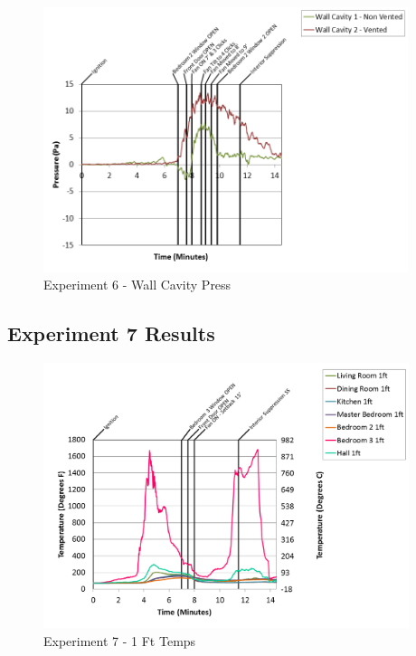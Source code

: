 \documentclass{article}
\begin{document}
\begin{appendices}
\begin{figure}[h!]
	\centering
	\includegraphics[height=3.05in]{0_Images/Results_Charts/Exp_6_Charts/WallCavityPress.png}
	\caption{Experiment 6 - Wall Cavity Press}
\end{figure}

\clearpage

\clearpage
\clearpage		\large
\subsection{Experiment 7 Results} \label{App:Exp7Results} 

\begin{figure}[h!]
	\centering
	\includegraphics[height=3.05in]{0_Images/Results_Charts/Exp_7_Charts/1FtTemps.png}
	\caption{Experiment 7 - 1 Ft Temps}
\end{figure}



\end{appendices}
\end{document}
